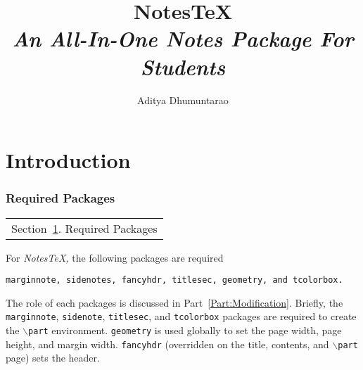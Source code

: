 \documentclass[10pt]{article}
\begin{document}
	\title{{NotesTeX}\\{\normalsize{\itshape An All-In-One Notes Package For Students}}}
	\author{Aditya Dhumuntarao}
	\maketitle
	\newpage
	\pagestyle{fancynotes}
	\part{Introduction}

	\section{Required Packages}\label{sec:reqpackages}
	\begin{margintable}\vspace{.8in}\footnotesize
		\begin{tabularx}{\marginparwidth}{|X}
		Section~\ref{sec:reqpackages}. Required Packages\\
		\end{tabularx}
	\end{margintable}
	For \textit{NotesTeX,} the following packages are required
	\begin{center}
		\texttt{marginnote, sidenotes, fancyhdr, titlesec, geometry, and tcolorbox.}
	\end{center}
	The role of each packages is discussed in Part~\ref{Part:Modification}. Briefly, the \texttt{marginnote}, \texttt{sidenote}, \texttt{titlesec}, and \texttt{tcolorbox} packages are required to create the \texttt{$\backslash$part} environment. \texttt{geometry} is used globally to set the page width, page height, and margin width. \texttt{fancyhdr} (overridden on the title, contents, and \texttt{$\backslash$part} page) sets the header.
\end{document}
